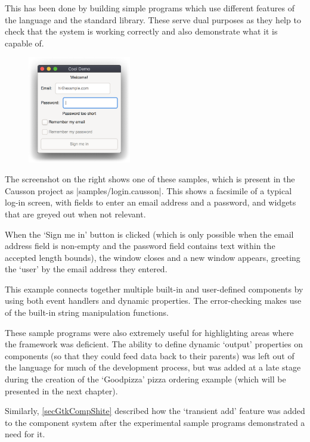 \documentclass[11pt]{report}
\begin{document}
This has been done by building simple programs which use different features of the language and the standard library. These serve dual purposes as they help to check that the system is working correctly and also demonstrate what it is capable of.

\begin{figure}
\vspace{-1cm}
\includegraphics[width=0.4\textwidth]{loginDemo.png}
\vspace{-1.7cm}
\end{figure}

The screenshot on the right shows one of these samples, which is present in the Causson project as |samples/login.causson|. This shows a facsimile of a typical log-in screen, with fields to enter an email address and a password, and widgets that are greyed out when not relevant.

When the `Sign me in' button is clicked (which is only possible when the email address field is non-empty and the password field contains text within the accepted length bounds), the window closes and a new window appears, greeting the `user' by the email address they entered.

This example connects together multiple built-in and user-defined components by using both event handlers and dynamic properties. The error-checking makes use of the built-in string manipulation functions.

These sample programs were also extremely useful for highlighting areas where the framework was deficient. The ability to define dynamic `output' properties on components (so that they could feed data back to their parents) was left out of the language for much of the development process, but was added at a late stage during the creation of the `Goodpizza' pizza ordering example (which will be presented in the next chapter).

Similarly, \cref{secGtkCompShite} described how the `transient add' feature was added to the component system after the experimental sample programs demonstrated a need for it.
\end{document}
